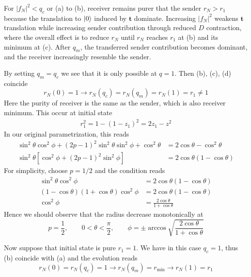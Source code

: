 \documentclass[../../../main.tex]{subfiles}
\begin{document}
For $|f_N|^2<q_c$ or (a) to (b), receiver remains purer that the sender $r_N>r_1$ because the translation to $\ket{0}$ induced by $\mathbf{t}$ dominate.
Increasing $|f_N|^2$ weakens  $\mathbf{t}$ translation while  increasing sender contribution through reduced $D$ contraction, where the overall effect is to reduce $r_N$ until $r_N$ reaches $r_1$ at (b) and its minimum at (c).
After $q_m$, the transferred sender contribution becomes dominant, and the receiver increasingly resemble the sender.

By setting $q_m=q_c$ we see that it is only possible at $q=1$.
Then (b), (c), (d) coincide 
\begin{equation*}
   r_N(0)=1 \longrightarrow r_N(q_c)=r_N(q_m)= r_N(1) = r_1\neq1
\end{equation*}
Here the purity of receiver is the same as the sender, which is also receiver minimum.
This occur at initial state
\begin{align*}
r_1^2 = 1-(1-z_1)^2 = 2z_1-z^2  
\end{align*}
In our original parametrization, this reads 
\begin{align*}
\sin^2\theta\cos^2\phi +(2p-1)^2\sin^2\theta\sin^2\phi +\cos^2\theta & =  2\cos\theta-\cos^2\theta \\
 \sin^2\theta \left[ \cos^2\phi+(2p-1)^2\sin^2\phi \right] & =  2\cos\theta(1-\cos\theta) 
\end{align*}
For simplicity, choose $p=1/2$ and the condition reads 
\begin{align*}
\sin^2\theta\cos^2\phi & =  2\cos\theta(1-\cos\theta)\\
(1-\cos\theta)(1+\cos\theta)\cos^2\phi & =  2\cos\theta(1-\cos\theta)\\
 \cos^2\phi & =  
 \frac{2\cos\theta}{1+\cos\theta} 
\end{align*}
Hence we should observe that the radius decrease monotonically at 
\begin{equation*}
  p=\frac{1 }{2 },
  \qquad 0<\theta<\frac{\pi }{2 }, 
  \qquad \phi = \pm \arccos \sqrt{ \frac{2\cos\theta}{1+\cos\theta} }
\end{equation*}

Now suppose that initial state is pure $r_1=1$.
We have in this case $q_c=1$, thus (b) coincide with (a) and the evolution reads
\begin{equation*}
  r_N(0)=r_N(q_c)=1\longrightarrow
  r_N(q_m)=r_{\min}\longrightarrow
  r_N(1)=r_1
\end{equation*}
\end{document}
